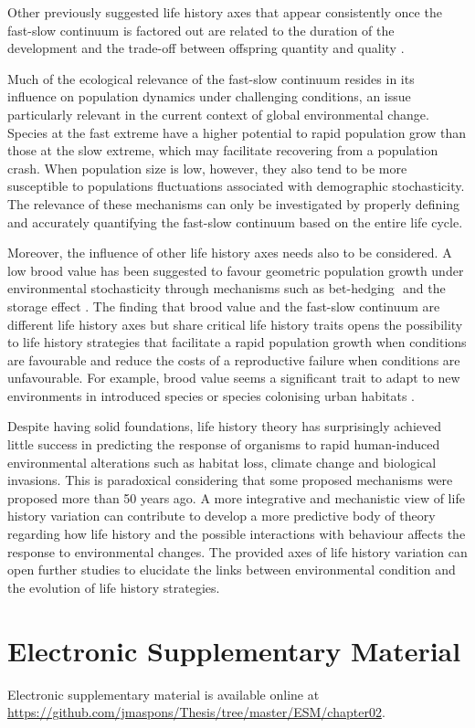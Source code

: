 Other previously suggested life history axes that appear consistently
once the fast-slow continuum is factored out are related to the duration of the
development and the trade-off between offspring quantity and quality
\citep{Promislow1990,Bielby2007,Dobson2007}.

Much of the ecological relevance of the fast-slow continuum resides in its 
influence on population dynamics under challenging conditions, an issue 
particularly relevant in the current context of global environmental change. 
Species at the fast extreme have a higher potential to rapid population grow 
than those at the slow extreme, which may facilitate recovering from a 
population crash. When population size is low, however, they also tend to be 
more susceptible to populations fluctuations associated with demographic 
stochasticity. The relevance of these mechanisms can only be investigated by 
properly defining and accurately quantifying the fast-slow continuum based on 
the entire life cycle. 

Moreover, the influence of other life history axes needs also to be considered. 
A low brood value has been suggested to favour geometric population growth under 
environmental stochasticity through mechanisms such as bet-hedging 
\citep{Stearns2000a}⁠ and the storage effect \citep{Cubaynes2011}. The finding
that brood value and the fast-slow continuum are different life history axes but
share critical life history traits opens the possibility to life history
strategies that facilitate a rapid population growth when conditions are
favourable and reduce the costs of a reproductive failure when conditions are
unfavourable. For example, brood value seems a significant trait to adapt to
new environments in introduced species or species colonising urban habitats
\citep{Sol2012a,Sol2014}.

Despite having solid foundations, life history theory has surprisingly achieved 
little success in predicting the response of organisms to rapid human-induced 
environmental alterations such as habitat loss, climate change and biological 
invasions. This is paradoxical considering that some proposed mechanisms were 
proposed more than 50 years ago. A more integrative and mechanistic view of life 
history variation can contribute to develop a more predictive body of theory 
regarding how life history and the possible interactions with behaviour
\citep{Ricklefs2002,Reale2010a,Sol2018,Maspons2019} affects the response to
environmental changes. The provided axes of life history variation can open
further studies to elucidate the links between environmental condition and the
evolution of life history strategies.

\section*{Electronic Supplementary Material}

Electronic supplementary material is available online at
\url{https://github.com/jmaspons/Thesis/tree/master/ESM/chapter02}.
